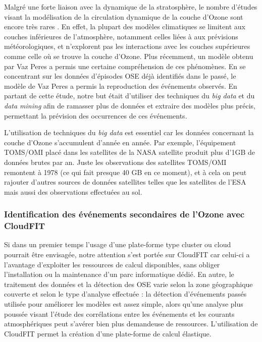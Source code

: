 
Malgré une forte liaison avec la dynamique de la stratosphère, le nombre d'études visant la modélisation de la circulation dynamique de la couche d'Ozone sont encore très rares \cite{Marchand2005}. En effet, la plupart des modèles climatiques se limitent aux couches inférieures de l'atmosphère, notamment celles liées à aux prévisions météorologiques, et n'explorent pas les interactions avec les couches supérieures comme celle où se trouve la couche d'Ozone. Plus récemment, un modèle obtenu par Vaz Peres \cite{Peres2013} a permis une certaine compréhension de ces phénomènes. En se concentrant sur les données d'épisodes OSE déjà identifiés dans le passé, le modèle de Vaz Peres a permis la reproduction des événements observés. En partant de cette étude, notre but était d'utiliser des techniques du \textit{big data} et du \textit{data mining} afin de ramasser plus de données et extraire des modèles plus précis, permettant la prévision des occurrences de ces événements.

L'utilisation de techniques du \textit{big data} est essentiel car les données concernant la couche d'Ozone s'accumulent d'année en année. Par exemple, l'équipement TOMS/OMI placé dans les satellites de la NASA satellite produit plus d'1GB de données brutes par an. Juste les observations des satellites TOMS/OMI remontent à 1978 (ce qui fait presque 40 GB en ce moment), et à cela on peut rajouter d'autres sources de données satellites telles que les satellites de l'ESA mais aussi des observations effectuées au sol. 

\subsubsection{Identification des événements secondaires de l'Ozone avec CloudFIT\label{sec:development}}

Si dans un premier temps l'usage d'une plate-forme type cluster ou cloud pourrait être envisagée, notre attention s'est portée sur CloudFIT car celui-ci a l'avantage d'exploiter les ressources de calcul disponibles, sans obliger l'installation ou la maintenance d'un parc informatique dédié. En autre, le traitement des données et la détection des OSE varie selon la zone géographique couverte et selon le type d'analyse effectuée : la détection d'événements passés utilisée pour améliorer les modèles est assez simple, alors qu'une analyse plus poussée visant l'étude des corrélations entre les événements et les courants atmosphériques peut s'avérer bien plus demandeuse de ressources. L'utilisation de CloudFIT permet la création d'une plate-forme de calcul élastique.

